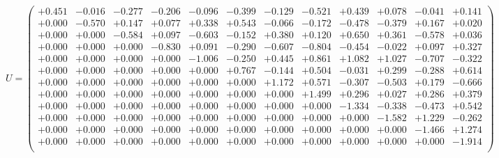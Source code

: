 \documentclass[9pt]{article}
\theoremstyle{plain}
\theoremstyle{definition}
\theoremstyle{remark}
\numberwithin{equation}{section}
\begin{document}
$U = \left(
\begin{array}{
cccccccccccc}
+0.451 & -0.016 & -0.277 & -0.206 & -0.096 & -0.399 & -0.129 & -0.521 & +0.439 & +0.078 & -0.041 & +0.141 \\
+0.000 & -0.570 & +0.147 & +0.077 & +0.338 & +0.543 & -0.066 & -0.172 & -0.478 & -0.379 & +0.167 & +0.020 \\
+0.000 & +0.000 & -0.584 & +0.097 & -0.603 & -0.152 & +0.380 & +0.120 & +0.650 & +0.361 & -0.578 & +0.036 \\
+0.000 & +0.000 & +0.000 & -0.830 & +0.091 & -0.290 & -0.607 & -0.804 & -0.454 & -0.022 & +0.097 & +0.327 \\
+0.000 & +0.000 & +0.000 & +0.000 & -1.006 & -0.250 & +0.445 & +0.861 & +1.082 & +1.027 & -0.707 & -0.322 \\
+0.000 & +0.000 & +0.000 & +0.000 & +0.000 & +0.767 & -0.144 & +0.504 & -0.031 & +0.299 & -0.288 & +0.614 \\
+0.000 & +0.000 & +0.000 & +0.000 & +0.000 & +0.000 & +1.172 & +0.571 & -0.307 & -0.503 & +0.179 & -0.666 \\
+0.000 & +0.000 & +0.000 & +0.000 & +0.000 & +0.000 & +0.000 & +1.499 & +0.296 & +0.027 & +0.286 & +0.379 \\
+0.000 & +0.000 & +0.000 & +0.000 & +0.000 & +0.000 & +0.000 & +0.000 & -1.334 & -0.338 & -0.473 & +0.542 \\
+0.000 & +0.000 & +0.000 & +0.000 & +0.000 & +0.000 & +0.000 & +0.000 & +0.000 & -1.582 & +1.229 & -0.262 \\
+0.000 & +0.000 & +0.000 & +0.000 & +0.000 & +0.000 & +0.000 & +0.000 & +0.000 & +0.000 & -1.466 & +1.274 \\
+0.000 & +0.000 & +0.000 & +0.000 & +0.000 & +0.000 & +0.000 & +0.000 & +0.000 & +0.000 & +0.000 & -1.914 \\
\end{array}
\right)$ \newline 
\end{document}
